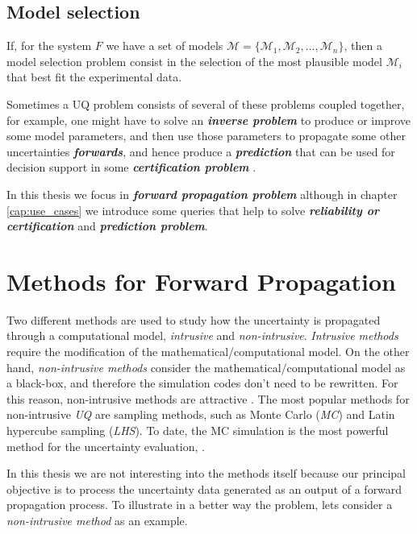 \subsection{Model selection}
If, for the system $F$ we have a set of models $\mathcal{M} = \lbrace \mathcal{M}_{1}, \mathcal{M}_{2},...,\mathcal{M}_{n} \rbrace$, then a model selection problem consist in the selection of the most plausible model $\mathcal{M}_{i}$ that best fit the experimental data.

Sometimes a UQ problem consists of several of these problems coupled together, for example, one might have to solve an \textbf{\textit{inverse problem}} to produce or improve some model parameters, and then use those parameters to propagate some other uncertainties \textbf{\textit{forwards}}, and hence produce a \textbf{\textit{prediction}} that can be used for decision support in some \textbf{\textit{certification problem}} \cite{Sullivan2015}.

In this thesis we focus in \textbf{\textit{forward propagation problem}} although in chapter \ref{cap:use_cases} we introduce some queries that help to solve \textbf{\textit{reliability or certification}} and \textbf{\textit{prediction problem}}.

\section{Methods for Forward Propagation}\label{sec:methods_uq_propagation}

Two different methods are used to study how the uncertainty is propagated through a computational model, \textit{intrusive} and \textit{non-intrusive}. \textit{Intrusive methods} require the modification of the mathematical/computational model. On the other hand, \textit{non-intrusive methods} consider the mathematical/computational model as a black-box, and therefore the simulation codes don't need to be rewritten. For this reason, non-intrusive methods are attractive \cite{Kawai2014}. The most popular methods for non-intrusive \textit{UQ} are sampling methods, such as Monte Carlo (\textit{MC}) and Latin hypercube sampling (\textit{LHS}). To date, the MC simulation is the most powerful method for the uncertainty evaluation, \cite{Rajan2016a}.

In this thesis we are not interesting into the methods itself because our principal objective is to process the uncertainty data generated as an output of a forward propagation process. To illustrate in a better way the problem, lets consider a \textit{non-intrusive method} as an example.

